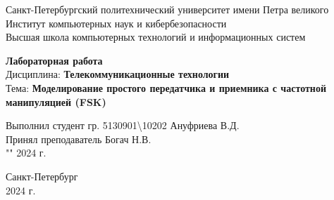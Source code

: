 \begingroup
\fontsize{12pt}{14pt}\selectfont

\begin{center}

    Санкт-Петербургский политехнический университет имени Петра великого\\
    Институт компьютерных наук и кибербезопасности\\
    Высшая школа компьютерных технологий и информационных систем\\

    \vspace{\fill}

    \onehalfspacing
    \textbf{\huge Лабораторная работа }\\
    \medbreak
    Дисциплина:\textbf{ Телекоммуникационные технологии}\\
    Тема: \textbf{ Моделирование простого передатчика и приемника с частотной манипуляцией (FSK) }\\
    \vspace{2.0cm}
\end{center}


\begin{flushright}
    \doublespacing
    Выполнил студент гр. 5130901{\textbackslash}10202 \underline{\hspace{7em}} Ануфриева В.Д.\\
    \smallskip
    Принял преподаватель \uline{\hspace{7em}}Богач Н.В. \\
    \smallskip
    "\uline{\hspace{1.5em}}" \uline{\hspace{5em}} 2024 г.\\
\end{flushright}

\vspace{\fill}

\begin{center}
    Санкт-Петербург\\
    2024 г.\\
\end{center}

\singlespacing

\pagebreak

\endgroup
